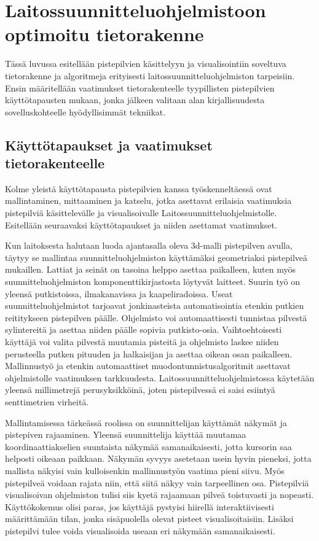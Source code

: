 \section{Laitossuunnitteluohjelmistoon optimoitu tietorakenne} \label{mun}

Tässä luvussa esitellään pistepilvien käsittelyyn ja visualisointiin soveltuva tietorakenne ja algoritmeja erityisesti laitossuunnitteluohjelmiston tarpeisiin. Ensin määritellään vaatimukset tietorakenteelle tyypillisten pistepilvien käyttötapausten mukaan, jonka jälkeen valitaan alan kirjallisuudesta sovelluskohteelle hyödyllisimmät tekniikat.

\subsection{Käyttötapaukset ja vaatimukset tietorakenteelle}\label{usecase}

Kolme yleistä käyttötapausta pistepilvien kanssa työskenneltäessä ovat mallintaminen, mittaaminen ja katselu, jotka asettavat erilaisia vaatimuksia pistepilviä käsittelevälle ja visualisoivalle Laitossuunnitteluohjelmistolle. Esitellään seuraavaksi käyttötapaukset ja niiden asettamat vaatimukset. 

\subtitle{Mallintaminen}
 Kun laitoksesta halutaan luoda ajantasalla oleva 3d-malli pistepilven avulla, täytyy se mallintaa suunnitteluohjelmiston käyttämäksi geometriaksi pistepilveä mukaillen. Lattiat ja seinät on tasoina helppo asettaa paikalleen, kuten myös suunnitteluohjelmiston komponenttikirjastosta löytyvät laitteet. Suurin työ on yleensä putkistoissa, ilmakanavissa ja kaapeliradoissa. Useat suunnitteluohjelmistot tarjoavat jonkinasteista automatisointia etenkin putkien reititykseen pistepilven päälle. Ohjelmisto voi automaattisesti tunnistaa pilvestä sylintereitä ja asettaa niiden päälle sopivia putkisto-osia. Vaihtoehtoisesti käyttäjä voi valita pilvestä muutamia pisteitä ja ohjelmisto laskee niiden perusteella putken pituuden ja halkaisijan ja asettaa oikean osan paikalleen. Mallinnustyö ja etenkin automaattiset muodontunnistusalgoritmit asettavat ohjelmistolle vaatimuksen tarkkuudesta. Laitossuunnitteluohjelmistossa käytetään yleensä millimetrejä perusyksikköinä, joten pistepilvessä ei saisi esiintyä senttimetrien virheitä.

Mallintamisessa tärkeässä roolissa on suunnittelijan käyttämät näkymät ja pistepiven rajaaminen. Yleensä suunnittelija käyttää muutamaa koordinaattiakselien suuntaista näkymää samanaikaisesti, jotta kursorin saa helposti oikeaan paikkaan. Näkymän syvyys asetetaan usein hyvin pieneksi, jotta mallista näkyisi vain kulloisenkin mallinnustyön vaatima pieni siivu. Myös pistepilveä voidaan rajata niin, että siitä näkyy vain tarpeellinen osa. Pistepilviä visualisoivan ohjelmiston tulisi siis kyetä rajaamaan pilveä toistuvasti ja nopeasti. Käyttökokemus olisi paras, jos käyttäjä pystyisi hiirellä interaktiivisesti määrittämään tilan, jonka sisäpuolella olevat pisteet visualisoitaisiin. Lisäksi pistepilvi tulee voida visualisoida useaan eri näkymään samanaikaisesti.

